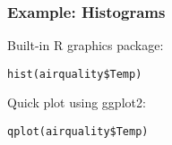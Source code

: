 \documentclass{beamer}
\begin{document}
	\begin{frame}[fragile]
		\frametitle{Example: Histograms}

		Built-in R graphics package:

		\vspace{2em}

		\begin{exampleblock}{}
		\begin{center}
		\begin{BVerbatim}
hist(airquality$Temp)
		\end{BVerbatim}
		\end{center}
		\end{exampleblock}{}

		\vspace{2em}

		Quick plot using ggplot2:

		\vspace{2em}

		\begin{exampleblock}{}
		\begin{center}
		\begin{BVerbatim}
qplot(airquality$Temp)
		\end{BVerbatim}
		\end{center}
		\end{exampleblock}{}

	\end{frame}
\end{document}
